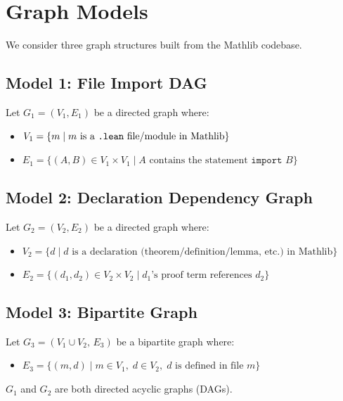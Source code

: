 \section{Graph Models}

We consider three graph structures built from the Mathlib codebase.

\subsection{Model 1: File Import DAG}

Let $G_1 = (V_1, E_1)$ be a directed graph where:
\begin{itemize}
  \item $V_1 = \{m \mid m \text{ is a \texttt{.lean} file/module in Mathlib}\}$
  \item $E_1 = \{(A, B) \in V_1 \times V_1 \mid A \text{ contains the statement } \texttt{import } B\}$
\end{itemize}

\subsection{Model 2: Declaration Dependency Graph}

Let $G_2 = (V_2, E_2)$ be a directed graph where:
\begin{itemize}
  \item $V_2 = \{d \mid d \text{ is a declaration (theorem/definition/lemma, etc.) in Mathlib}\}$
  \item $E_2 = \{(d_1, d_2) \in V_2 \times V_2 \mid d_1 \text{'s proof term references } d_2\}$
\end{itemize}

\subsection{Model 3: Bipartite Graph}

Let $G_3 = (V_1 \cup V_2,\, E_3)$ be a bipartite graph where:
\begin{itemize}
  \item $E_3 = \{(m, d) \mid m \in V_1,\; d \in V_2,\; d \text{ is defined in file } m\}$
\end{itemize}

\begin{property}
$G_1$ and $G_2$ are both directed acyclic graphs (DAGs).
\end{property}
